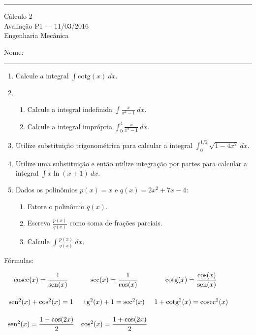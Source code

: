 \documentclass{article}
\newcommand{\sen}{\mbox{sen}}
\newcommand{\tg}{\mbox{tg}}
\newcommand{\cosec}{\mbox{cosec}}
\newcommand{\cotg}{\mbox{cotg}}
\begin{document}
\noindent{}\rule{\textwidth}{0.4pt}
\begin{center}
	C\'alculo 2\\
	Avalia\c{c}\~ao P1 --- 11/03/2016 \\
	Engenharia Mec\^anica \\
	\vspace{0.2cm}
\end{center}
Nome: \\
\noindent{}\rule{\textwidth}{0.4pt}

\begin{enumerate}
\item Calcule a integral $\displaystyle\int \mbox{cotg}(x)\ dx$.

\item
	\begin{enumerate}
		\item Calcule a integral indefinida $\displaystyle\int \frac{x}{x^2-1}\ dx$.
		\item Calcule a integral impr\'opria $\displaystyle\int_0^4 \frac{x}{x^2-1}\ dx$.
	\end{enumerate}

\item Utilize substitui\c{c}\~ao trigonom\'etrica para calcular a integral $\displaystyle\int_0^{1/2} \sqrt{1-4x^2}\ dx$.

\item Utilize uma substitui\c{c}\~ao e ent\~ao utilize integra\c{c}\~ao por partes para calcular a integral $\displaystyle\int x\ln(x+1)\ dx$.

\item Dados os polin\^omios $p(x) = x$ e $q(x)=2x^2+7x-4$:
	\begin{enumerate}
		\item Fatore o polin\^omio $q(x)$.
		\item Escreva $\displaystyle\frac{p(x)}{q(x)}$ como soma de fra\c{c}\~oes parciais.
		\item Calcule $\displaystyle\int\frac{p(x)}{q(x)}\ dx$.
	\end{enumerate}

\end{enumerate}
F\'ormulas:

$\begin{array}{ccc}
	\vspace{0.5cm}
	\cosec(x) = \displaystyle\frac{1}{\sen(x)} & \sec(x) = \displaystyle\frac{1}{\cos(x)} & \cotg(x) = \displaystyle\frac{\cos(x)}{\sen(x)} \\
	\vspace{0.5cm}
	\sen^2(x) + \cos^2(x) = 1 & \tg^2(x) + 1 = \sec^2(x) & 1 + \cotg^2(x) = \cosec^2(x) \\
	\vspace{0.5cm}
	\sen^2(x) = \displaystyle\frac{1 - \cos(2x)}{2} & \cos^2(x) = \displaystyle\frac{1 + \cos(2x)}{2} &
\end{array}$
\end{document}
